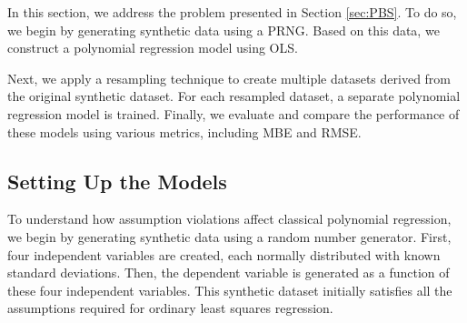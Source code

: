 


In this section, we address the problem presented in Section \ref{sec:PBS}. To do so, we begin by generating synthetic data using a PRNG. Based on this data, we construct a polynomial regression model using OLS.

\noindent Next, we apply a resampling technique to create multiple datasets derived from the original synthetic dataset. For each resampled dataset, a separate polynomial regression model is trained. Finally, we evaluate and compare the performance of these models using various metrics, including MBE and RMSE.

\subsection{Setting Up the Models}
To understand how assumption violations affect classical polynomial regression, we begin by generating synthetic data using a random number generator. First, four independent variables are created, each normally distributed with known standard deviations. Then, the dependent variable is generated as a function of these four independent variables. This synthetic dataset initially satisfies all the assumptions required for ordinary least squares regression.
\\\\




